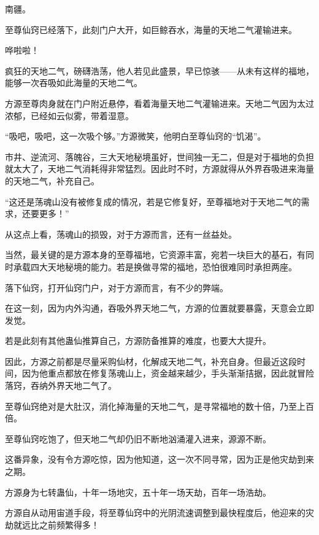 
\begin{this_body}



南疆。

至尊仙窍已经落下，此刻门户大开，如巨鲸吞水，海量的天地二气灌输进来。

哗啦啦！

疯狂的天地二气，磅礴浩荡，他人若见此盛景，早已惊骇——从未有这样的福地，能够一次吞吸如此海量的天地二气。

方源至尊肉身就在门户附近悬停，看着海量天地二气灌输进来。天地二气因为太过浓郁，已经如云似雾，带着湿意。

“吸吧，吸吧，这一次吸个够。”方源微笑，他明白至尊仙窍的“饥渴”。

市井、逆流河、落魄谷，三大天地秘境虽好，世间独一无二，但是对于福地的负担就太大了，天地二气消耗得非常猛烈。因此时不时，方源就得从外界吞吸进来海量的天地二气，补充自己。

“这还是荡魂山没有被修复成的情况，若是它修复好，至尊福地对于天地二气的需求，还要更多！”

从这点上看，荡魂山的损毁，对于方源而言，还有一丝益处。

当然，最关键的是方源本身的至尊福地，它资源丰富，宛若一块巨大的基石，有同时承载四大天地秘境的能力。若是换做寻常的福地，恐怕很难同时承担两座。

落下仙窍，打开仙窍门户，对于方源而言，有不少的弊端。

在这一刻，因为内外沟通，吞吸外界天地二气，方源的位置就要暴露，天意会立即发觉。

若是此刻有其他蛊仙推算自己，方源防备推算的难度，也要大大提升。

因此，方源之前都是尽量采购仙材，化解成天地二气，补充自身。但最近这段时间，因为他重点都放在修复荡魂山上，资金越来越少，手头渐渐拮据，因此就冒险落窍，吞纳外界天地二气了。

至尊仙窍绝对是大肚汉，消化掉海量的天地二气，是寻常福地的数十倍，乃至上百倍。

至尊仙窍吃饱了，但天地二气却仍旧不断地汹涌灌入进来，源源不断。

这番异象，没有令方源吃惊，因为他知道，这一次不同寻常，因为正是他灾劫到来之期。

方源身为七转蛊仙，十年一场地灾，五十年一场天劫，百年一场浩劫。

方源自从动用宙道手段，将至尊仙窍中的光阴流速调整到最快程度后，他迎来的灾劫就远比之前频繁得多！


\end{this_body}
